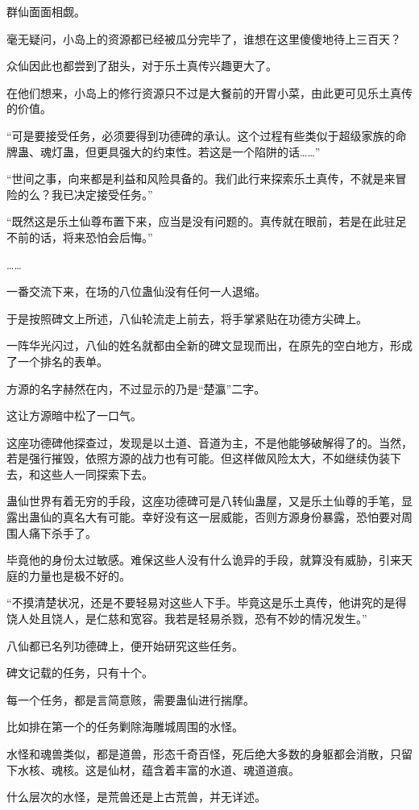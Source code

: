 \begin{this_body}
群仙面面相觑。

毫无疑问，小岛上的资源都已经被瓜分完毕了，谁想在这里傻傻地待上三百天？

众仙因此也都尝到了甜头，对于乐土真传兴趣更大了。

在他们想来，小岛上的修行资源只不过是大餐前的开胃小菜，由此更可见乐土真传的价值。

“可是要接受任务，必须要得到功德碑的承认。这个过程有些类似于超级家族的命牌蛊、魂灯蛊，但更具强大的约束性。若这是一个陷阱的话……”

“世间之事，向来都是利益和风险具备的。我们此行来探索乐土真传，不就是来冒险的么？我已决定接受任务。”

“既然这是乐土仙尊布置下来，应当是没有问题的。真传就在眼前，若是在此驻足不前的话，将来恐怕会后悔。”

……

一番交流下来，在场的八位蛊仙没有任何一人退缩。

于是按照碑文上所述，八仙轮流走上前去，将手掌紧贴在功德方尖碑上。

一阵华光闪过，八仙的姓名就都由全新的碑文显现而出，在原先的空白地方，形成了一个排名的表单。

方源的名字赫然在内，不过显示的乃是“楚瀛”二字。

这让方源暗中松了一口气。

这座功德碑他探查过，发现是以土道、音道为主，不是他能够破解得了的。当然，若是强行摧毁，依照方源的战力也有可能。但这样做风险太大，不如继续伪装下去，和这些人一同探索下去。

蛊仙世界有着无穷的手段，这座功德碑可是八转仙蛊屋，又是乐土仙尊的手笔，显露出蛊仙的真名大有可能。幸好没有这一层威能，否则方源身份暴露，恐怕要对周围人痛下杀手了。

毕竟他的身份太过敏感。难保这些人没有什么诡异的手段，就算没有威胁，引来天庭的力量也是极不好的。

“不摸清楚状况，还是不要轻易对这些人下手。毕竟这是乐土真传，他讲究的是得饶人处且饶人，是仁慈和宽容。我若是轻易杀戮，恐有不妙的情况发生。”

八仙都已名列功德碑上，便开始研究这些任务。

碑文记载的任务，只有十个。

每一个任务，都是言简意赅，需要蛊仙进行揣摩。

比如排在第一个的任务剿除海雕城周围的水怪。

水怪和魂兽类似，都是道兽，形态千奇百怪，死后绝大多数的身躯都会消散，只留下水核、魂核。这是仙材，蕴含着丰富的水道、魂道道痕。

什么层次的水怪，是荒兽还是上古荒兽，并无详述。


\end{this_body}
